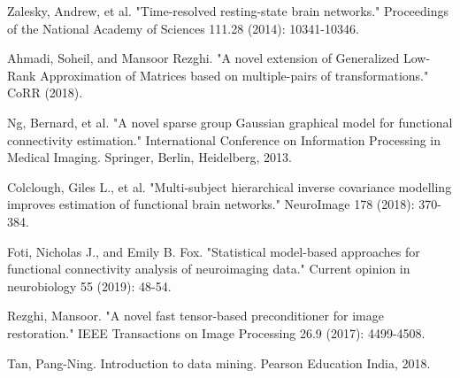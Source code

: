 \documentclass[preprint,12pt]{elsarticle}
\begin{document}
\begin{thebibliography}{1}
			Zalesky, Andrew, et al. "Time-resolved resting-state brain networks." Proceedings of the National Academy of Sciences 111.28 (2014): 10341-10346.
			
			Ahmadi, Soheil, and Mansoor Rezghi. "A novel extension of Generalized Low-Rank Approximation of Matrices based on multiple-pairs of transformations." CoRR (2018).
				
			Ng, Bernard, et al. "A novel sparse group Gaussian graphical model for functional connectivity estimation." International Conference on Information Processing in Medical Imaging. Springer, Berlin, Heidelberg, 2013.
			
			Colclough, Giles L., et al. "Multi-subject hierarchical inverse covariance modelling improves estimation of functional brain networks." NeuroImage 178 (2018): 370-384.
			
			Foti, Nicholas J., and Emily B. Fox. "Statistical model-based approaches for functional connectivity analysis of neuroimaging data." Current opinion in neurobiology 55 (2019): 48-54.	
		
		Rezghi, Mansoor. "A novel fast tensor-based preconditioner for image restoration." IEEE Transactions on Image Processing 26.9 (2017): 4499-4508.
				
				
			Tan, Pang-Ning. Introduction to data mining. Pearson Education India, 2018.
			
			
\end{thebibliography}
\end{document}
